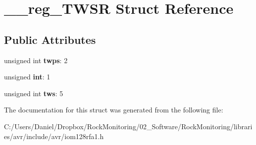 \hypertarget{struct____reg___t_w_s_r}{}\section{\+\_\+\+\_\+reg\+\_\+\+T\+W\+SR Struct Reference}
\label{struct____reg___t_w_s_r}
\subsection*{Public Attributes}
\begin{DoxyCompactItemize}
\item 
unsigned int {\bfseries twps}\+: 2\hypertarget{struct____reg___t_w_s_r_a82006c63698cb25b1a6556c2d1b843d8}{}\label{struct____reg___t_w_s_r_a82006c63698cb25b1a6556c2d1b843d8}

\item 
unsigned {\bfseries int}\+: 1\hypertarget{struct____reg___t_w_s_r_a351dec5b70fa60a8be15fc15cd250546}{}\label{struct____reg___t_w_s_r_a351dec5b70fa60a8be15fc15cd250546}

\item 
unsigned int {\bfseries tws}\+: 5\hypertarget{struct____reg___t_w_s_r_a84472752f2945a954f5d12225c5b2c36}{}\label{struct____reg___t_w_s_r_a84472752f2945a954f5d12225c5b2c36}

\end{DoxyCompactItemize}


The documentation for this struct was generated from the following file\+:\begin{DoxyCompactItemize}
\item 
C\+:/\+Users/\+Daniel/\+Dropbox/\+Rock\+Monitoring/02\+\_\+\+Software/\+Rock\+Monitoring/libraries/avr/include/avr/iom128rfa1.\+h\end{DoxyCompactItemize}
